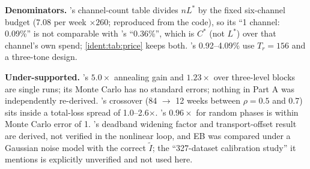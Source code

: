\begin{reviewernote}
\textbf{Denominators.} 's channel-count table divides $nL^*$ by the fixed six-channel budget (7.08 per week $\times 260$; reproduced from the code), so its ``1 channel: 0.09\%'' is not comparable with 's ``0.36\%'', which is $C^*$ (not $L^*$) over that channel's own spend; \cref{ident:tab:price} keeps both. 's 0.92--4.09\% use $T_r = 156$ and a three-tone design.

\textbf{Under-supported.} 's $5.0\times$ annealing gain and $1.23\times$ over three-level blocks are single runs; its Monte Carlo has no standard errors; nothing in Part A was independently re-derived. 's crossover (84 $\to$ 12 weeks between $\rho = 0.5$ and 0.7) sits inside a total-loss spread of 1.0--2.6$\times$. 's $0.96\times$ for random phases is within Monte Carlo error of 1. 's deadband widening factor and transport-offset result are derived, not verified in the nonlinear loop, and EB was compared under a Gaussian noise model with the correct $\tilde I$; the ``327-dataset calibration study'' it mentions is explicitly unverified and not used here.
\end{reviewernote}

